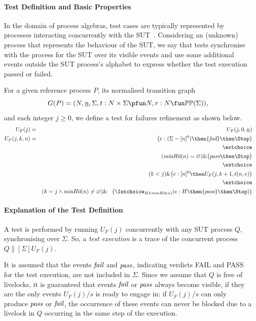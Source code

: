 \documentclass[3p,times]{elsarticle}
\newcommand{\taba}{\hspace*{3mm}}
\newcommand{\epass}{{\text{\it pass}}}
\newcommand{\efail}{{\text{\it fail}}}
\newcommand{\ii}[1]{\underline{#1}}
\newcommand{\minhits}{\text{\it minHit}}
\begin{document}
\paragraph{Test Definition and Basic Properties}
In the domain of process algebras, test cases are typically represented by
processes interacting concurrently with the
SUT~\cite{Hennessy:1988:ATP:50497}. Considering an (unknown) process that
represents the behaviour of the SUT, we say that tests synchronise with the
process for the SUT over its visible events and use some additional events
outside the SUT process's alphabet to express whether the test execution
passed or failed.

For a given reference process $P$, its normalised transition graph
$$
G(P) = ( N, \ii n, \Sigma, t : N\times\Sigma \pfun N, r : N \fun \mathbb{P}\mathbb{P}(\Sigma)),
$$
and each integer $j\ge 0$, we define a test for failures refinement as shown
below.
%
\begin{eqnarray}
\label{eq:UFP}
U_F(j) & = & U_F(j,0,\ii n)
\\
U_F(j,k,n) & = & \big(e:(\Sigma - [n]^0)  \then \efail\then \Stop \big)
\label{eq:ufa}
\\ & & \extchoice \nonumber
\\ & & (\minhits(n) =   \varnothing  )    \&   \big( \epass \then \Stop \big)
\label{eq:ufb}
\\ & & \extchoice \nonumber
\\ & & (k < j) \& \big(e:[n]^0   \then U_F(j,k+1,t(n,e) \big)
\label{eq:ufc}
\\ & & \extchoice \nonumber
\\ & & (k = j \wedge \minhits(n)\neq\varnothing) \& \taba \big( \Intchoice_{H\in\minhits(n)} (e:H   \then \epass \then\Stop   )  \big)
\label{eq:ufd}
\end{eqnarray}

\paragraph{Explanation of the Test Definition} A test \pagebreak is performed by running
$U_F(j)$ concurrently with any SUT process $Q$, synchronising over $\Sigma$.
So, a \emph{test execution} is a trace of the concurrent process
$Q\parallel[\Sigma] U_F(j)$.

It is assumed that the events $\efail$ and $\epass$, indicating verdicts FAIL
and PASS for the test execution, are not included in $\Sigma$. Since we
assume that $Q$ is free of livelocks, it is guaranteed that events $\efail$
or $\epass$ always become visible, if they are the only events $U_F(j)/s$ is
ready to engage in: if $U_F(j)/s$ can only produce $\epass$ or $\efail$, the
occurrence of these events can never be blocked due to a livelock in $Q$
occurring in the same step of the execution.
\end{document}
